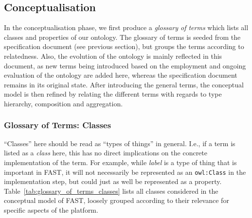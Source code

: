 \documentclass[twoside]{fast_latex}
\begin{document}
\doublespacing


\subsection{Conceptualisation} %
\label{sub:conceptualisation}

In the conceptualisation phase, we first produce a \emph{glossary of terms} which lists all classes and properties of our ontology. The glossary of terms is seeded from the specification document (see previous section), but groups the terms according to relatedness. Also, the evolution of the ontology is mainly reflected in this document, as new terms being introduced based on the employment and ongoing evaluation of the ontology are added here, whereas the specification document remains in its original state. After introducing the general terms, the conceptual model is then refined by relating the different terms with regards to type hierarchy, composition and aggregation.

\subsubsection{Glossary of Terms: Classes} %
\label{subs:classes}

``Classes'' here should be read as ``types of things'' in general. I.e., if a term is listed as a \emph{class} here, this has no direct implications on the concrete implementation of the term. For example, while \emph{label} is a type of thing that is important in FAST, it will not necessarily be represented as an \texttt{owl:Class} in the implementation step, but could just as well be represented as a property. Table~\ref{tab:glossary_of_terms_classes} lists all classes considered in the conceptual model of FAST, loosely grouped according to their relevance for specific aspects of the platform.
\end{document}
